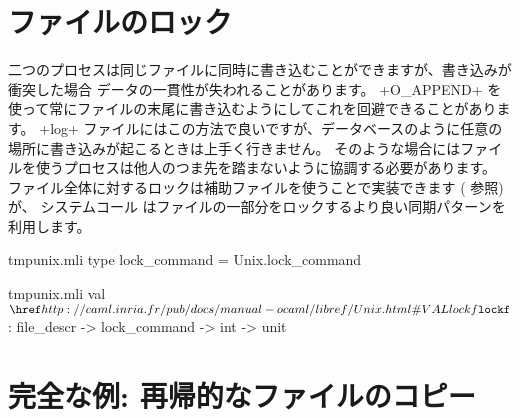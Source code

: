 \section{ファイルのロック}

二つのプロセスは同じファイルに同時に書き込むことができますが、書き込みが衝突した場合
データの一貫性が失われることがあります。
\ml+O_APPEND+ を使って常にファイルの末尾に書き込むようにしてこれを回避できることがあります。
\ml+log+ ファイルにはこの方法で良いですが、データベースのように任意の場所に書き込みが起こるときは上手く行きません。
そのような場合にはファイルを使うプロセスは他人のつま先を踏まないように協調する必要があります。
ファイル全体に対するロックは補助ファイルを使うことで実装できます (\pageref{page/lock} 参照) が、
システムコール  はファイルの一部分をロックするより良い同期パターンを利用します。
%
\begin{codefile}{tmpunix.mli}
type lock_command = Unix.lock_command
\end{codefile}
%
\begin{listingcodefile}{tmpunix.mli}
 val $\libvalue{Unix}{lockf}$ : file_descr -> lock_command -> int -> unit
\end{listingcodefile}


\section{\label{sec/copyrec}完全な例: 再帰的なファイルのコピー}

